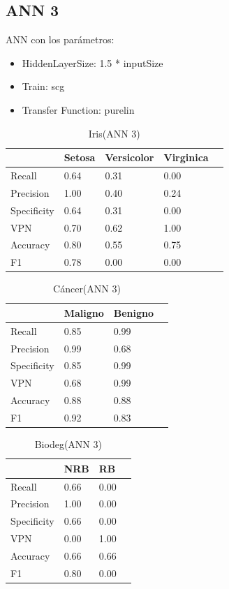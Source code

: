 \documentclass[a4paper,openwrite,12pt]{article}
\begin{document}
\subsection{ANN 3}
ANN con los parámetros:
\begin{itemize}
    \item HiddenLayerSize: 1.5 * inputSize
    \item Train: scg
    \item Transfer Function: purelin
\end{itemize}

\begin{table}[H]
\centering
\begin{tabular}{@{}lllll@{}}
\toprule
            & Setosa & Versicolor & Virginica &  \\ \midrule
Recall      & 0.64   & 0.31       & 0.00      &  \\
Precision   & 1.00   & 0.40       & 0.24      &  \\
Specificity & 0.64   & 0.31       & 0.00      &  \\
VPN         & 0.70   & 0.62       & 1.00      &  \\
Accuracy    & 0.80   & 0.55       & 0.75      &  \\
F1          & 0.78   & 0.00       & 0.00      &  \\ \bottomrule
\end{tabular}
\caption{Iris(ANN 3)}
\end{table}


\begin{table}[H]
\centering
\begin{tabular}{@{}llll@{}}
\toprule
            & Maligno & Benigno &  \\ \midrule
Recall      & 0.85    & 0.99    &  \\
Precision   & 0.99    & 0.68    &  \\
Specificity & 0.85    & 0.99    &  \\
VPN         & 0.68    & 0.99    &  \\
Accuracy    & 0.88    & 0.88    &  \\
F1          & 0.92    & 0.83    &  \\ \bottomrule
\end{tabular}
\caption{Cáncer(ANN 3)}
\end{table}

\begin{table}[H]
\centering
\begin{tabular}{@{}llll@{}}
\toprule
            & NRB &   RB &  \\ \midrule
Recall      & 0.66    & 0.00    &  \\
Precision   & 1.00    & 0.00    &  \\
Specificity & 0.66    & 0.00    &  \\
VPN         & 0.00    & 1.00    &  \\
Accuracy    & 0.66    & 0.66    &  \\
F1          & 0.80    & 0.00    &  \\ \bottomrule
\end{tabular}
\caption{Biodeg(ANN 3)}
\end{table}
\end{document}
